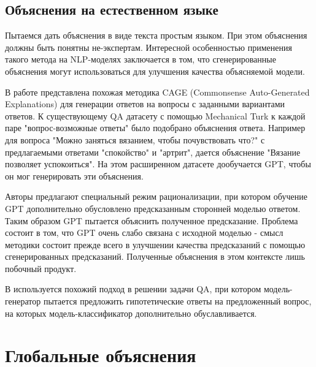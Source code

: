\vspace{8mm}
\subsection{Объяснения на естественном языке}

Пытаемся дать объяснения в виде текста простым языком. При этом объяснения должны быть понятны не-экспертам. Интересной особенностью применения такого метода на NLP-моделях заключается в том, что сгенерированные объяснения могут использоваться для улучшения качества объясняемой модели.

В работе \cite{rajaniExplainYourselfLeveraging2019} представлена похожая методика CAGE (Commonsense Auto-Generated Explanations) для генерации ответов на вопросы с заданными вариантами ответов. К существующему QA датасету с помощью Mechanical Turk к каждой паре "вопрос-возможные ответы" было подобрано объяснения ответа. Например для вопроса "Можно заняться вязанием, чтобы почувствовать что?" с предлагаемыми ответами "спокойство" и "артрит", дается объяснение "Вязание позволяет успокоиться". На этом расширенном датасете дообучается GPT, чтобы он мог генерировать эти объяснения.

Авторы предлагают специальный режим рационализации, при котором обучение GPT дополнительно обусловлено предсказанным сторонней моделью ответом. Таким образом  GPT пытается объяснить полученное предсказание. Проблема состоит в том, что GPT очень слабо связана с исходной моделью - смысл методики состоит прежде всего в улучшении качества предсказаний с помощью сгенерированных предсказаний. Полученные объяснения в этом контексте лишь побочный продукт.

В \cite{latcinnikExplainingQuestionAnswering2020} используется похожий подход в решении задачи QA, при котором модель-генератор пытается предложить гипотетические ответы на предложенный вопрос, на которых модель-классификатор дополнительно обуславливается. 


\vspace{15mm}
\section{Глобальные объяснения}

